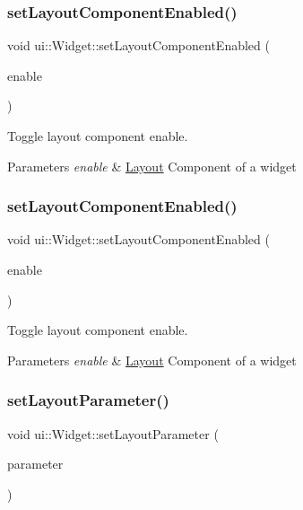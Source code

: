 \subsubsection{\texorpdfstring{set\+Layout\+Component\+Enabled()}{setLayoutComponentEnabled()}\hspace{0.1cm}{\footnotesize\ttfamily [1/2]}}
{\footnotesize\ttfamily void ui\+::\+Widget\+::set\+Layout\+Component\+Enabled (\begin{DoxyParamCaption}\item[{bool}]{enable }\end{DoxyParamCaption})}

Toggle layout component enable. 
\begin{DoxyParams}{Parameters}
{\em enable} & \hyperlink{classui_1_1Layout}{Layout} Component of a widget \\
\hline
\end{DoxyParams}
\mbox{\label{classui_1_1Widget_a28a78caf974c170fce6ef1742d517fae}} 
\subsubsection{\texorpdfstring{set\+Layout\+Component\+Enabled()}{setLayoutComponentEnabled()}\hspace{0.1cm}{\footnotesize\ttfamily [2/2]}}
{\footnotesize\ttfamily void ui\+::\+Widget\+::set\+Layout\+Component\+Enabled (\begin{DoxyParamCaption}\item[{bool}]{enable }\end{DoxyParamCaption})}

Toggle layout component enable. 
\begin{DoxyParams}{Parameters}
{\em enable} & \hyperlink{classui_1_1Layout}{Layout} Component of a widget \\
\hline
\end{DoxyParams}
\mbox{\label{classui_1_1Widget_abf9d727a2726259f82c097543d0be2d1}} 
\subsubsection{\texorpdfstring{set\+Layout\+Parameter()}{setLayoutParameter()}\hspace{0.1cm}{\footnotesize\ttfamily [1/2]}}
{\footnotesize\ttfamily void ui\+::\+Widget\+::set\+Layout\+Parameter (\begin{DoxyParamCaption}\item[{\hyperlink{classui_1_1LayoutParameter}{Layout\+Parameter} $\ast$}]{parameter }\end{DoxyParamCaption})}


